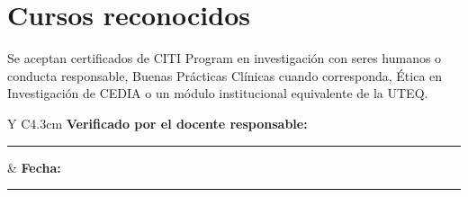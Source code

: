 \documentclass[10.5pt,a4paper]{article}
\begin{document}
\vspace{0.65cm}
\section{Cursos reconocidos}

Se aceptan certificados de CITI Program en investigación con seres humanos o conducta responsable, Buenas Prácticas Clínicas cuando corresponda, Ética en Investigación de CEDIA o un módulo institucional equivalente de la UTEQ.

\vfill
\begin{tabularx}{\textwidth}{Y C{4.3cm}}
\textbf{Verificado por el docente responsable:} \rule{7.0cm}{0.4pt} & \textbf{Fecha:} \rule{2.6cm}{0.4pt}\\[4pt]
\end{tabularx}
\end{document}
